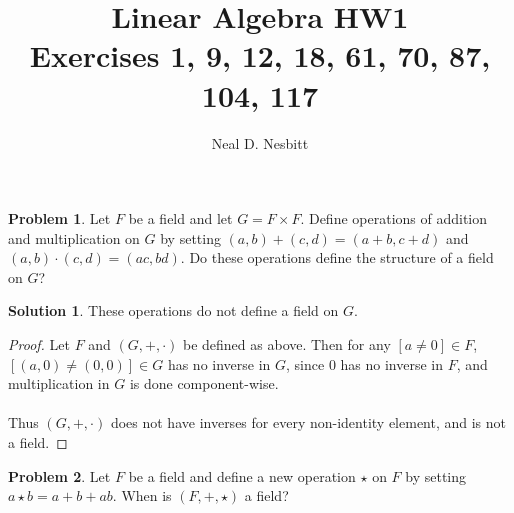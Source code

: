 \documentclass{article}
\title{Linear Algebra HW1\\
Exercises 1, 9, 12, 18, 61, 70, 87, 104, 117}
\author{Neal D. Nesbitt}
\begin{document}
\maketitle

\theoremstyle{definition}
\newtheorem{problem}{Problem}
\newtheorem{solution}{Solution}[problem]
\renewcommand{\thesolution}{\theproblem}

\begin{problem}
Let $F$ be a field and let $G = F \times F$. Define operations of addition and multiplication on $G$ by setting $(a,b) + (c,d) = (a+b,c+d)$ and $(a,b)\cdot (c,d) = (ac,bd)$. Do these operations define the structure of a field on $G$?
\end{problem}

\begin{solution}
These operations do not define a field on $G$.
\begin{proof}
Let $F$ and $(G,+,\cdot)$ be defined as above. Then for any $[a \ne 0] \in F$, $\left[(a,0) \ne (0,0)\right] \in G$ has no inverse in $G$, since $0$ has no inverse in $F$, and multiplication in $G$ is done component-wise.\\
\\
Thus $(G,+,\cdot)$ does not have inverses for every non-identity element, and is not a field.
\end{proof}
\end{solution}

\setcounter{problem}{8}
\begin{problem}
Let $F$ be a field and define a new operation $\star$ on $F$ by setting $a \star b = a + b + ab$. When is $(F, +, \star)$ a field?
\end{problem}
\end{document}

